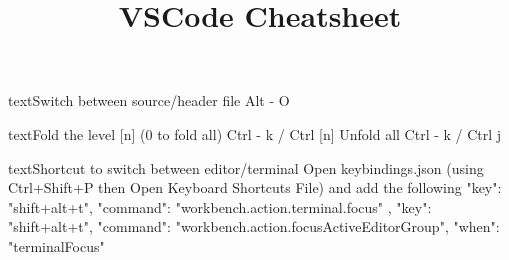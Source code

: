 \documentclass[10pt,a4paper]{article}
\title{\color{w3schools}VSCode Cheatsheet
}
\begin{document}
\maketitle

\small
\begin{multicols}{3}

\thispagestyle{empty}
\scriptsize



\begin{codebox}{text}{Switch between source/header file}
Alt - O

\end{codebox}

\begin{codebox}{text}{Fold the level [n] (0 to fold all)}
   Ctrl - k / Ctrl [n]
Unfold all
   Ctrl - k / Ctrl j

\end{codebox}

\begin{codebox}{text}{Shortcut to switch between editor/terminal}
Open keybindings.json (using Ctrl+Shift+P then
Open Keyboard Shortcuts File) and add the following
{
  "key": "shift+alt+t",
  "command": "workbench.action.terminal.focus"
},
{
  "key": "shift+alt+t",
  "command":
    "workbench.action.focusActiveEditorGroup",
  "when": "terminalFocus"
}

\end{codebox}


\AtNextBibliography{\footnotesize}
\printbibliography  
\end{multicols}
\end{document}
